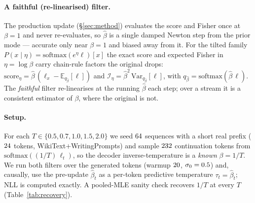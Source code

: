 \documentclass[11pt]{article}
\begin{document}
\paragraph{A faithful (re-linearised) filter.}
The production update (\S\ref{sec:method}) evaluates the score and Fisher once at
$\beta=1$ and never re-evaluates, so $\hat\beta$ is a single damped Newton step
from the prior mode --- accurate only near $\beta=1$ and biased away from it. For
the tilted family $P(x\mid\eta)=\mathrm{softmax}(e^{\eta}\ell)[x]$ the exact
score and expected Fisher in $\eta=\log\beta$ carry chain-rule factors the
original drops: $\mathrm{score}_\eta=\hat\beta\,(\ell_x-\mathbb{E}_{q_{\hat\beta}}[\ell])$
and $\mathcal{I}_\eta=\hat\beta^{2}\,\mathrm{Var}_{q_{\hat\beta}}[\ell]$, with
$q_{\hat\beta}=\mathrm{softmax}(\hat\beta\,\ell)$. The \emph{faithful} filter
re-linearises at the running $\hat\beta$ each step; over a stream it is a
consistent estimator of $\beta$, where the original is not.

\paragraph{Setup.}
For each $T\in\{0.5,0.7,1.0,1.5,2.0\}$ we seed $64$ sequences with a short
real prefix ($24$ tokens, WikiText$+$WritingPrompts) and sample $232$
continuation tokens from $\mathrm{softmax}((1/T)\,\ell_t)$, so the decoder
inverse-temperature is a \emph{known} $\beta=1/T$. We run both filters over the
generated tokens (warmup $20$, $\sigma_0=0.5$) and, causally, use
the pre-update $\hat\beta_t$ as a per-token predictive temperature
$\tau_t=\hat\beta_t$; NLL is computed exactly. A pooled-MLE sanity check recovers
$1/T$ at every $T$ (Table~\ref{tab:recovery}).
\end{document}
